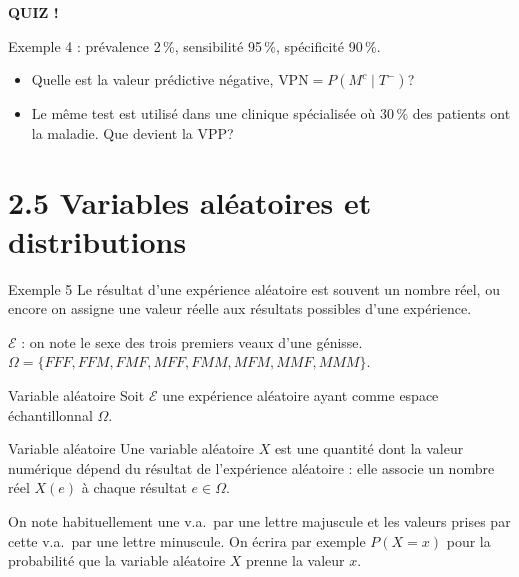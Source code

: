 \documentclass{BeamerTemplate}
\begin{document}
\begin{frame}[plain,t]
  \centerline{\LARGE\bfseries\alert{QUIZ !}}

  \medskip
  Exemple 4 : prévalence 2\,\%, sensibilité 95\,\%, spécificité 90\,\%.
  \begin{itemize}\itemsep 1.5cm
    \item Quelle est la \alert{valeur prédictive négative},
      $\text{VPN} = P(M^c \mid T^-)$?
    \item<2-> Le même test est utilisé dans une clinique spécialisée où
      30\,\% des patients ont la maladie. Que devient la VPP?
  \end{itemize}
\end{frame}

\section[Variables aléatoires]{2.5 Variables aléatoires et distributions}

\begin{frame}[t]{Exemple 5}
  Le résultat d'une expérience aléatoire est souvent un nombre réel, ou encore
  on assigne une valeur réelle aux résultats possibles d'une expérience.

  \medskip
  $\mathcal{E}$ : on note le sexe des trois premiers veaux d'une génisse.\\
  $\Omega = \{FFF, FFM, FMF, MFF, FMM, MFM, MMF, MMM\}$.

  \medskip
\end{frame}

\begin{frame}[t]{Variable aléatoire}
  Soit $\mathcal{E}$ une expérience aléatoire ayant comme espace
  échantillonnal $\Omega$.

  \begin{Boite}{Variable aléatoire}
    Une \alert{variable aléatoire} $X$ est une quantité dont la valeur
    numérique dépend du résultat de l'expérience aléatoire : elle associe un
    nombre réel $X(e)$ à chaque résultat $e \in \Omega$.
  \end{Boite}

  On note habituellement une v.a.\ par une lettre majuscule et les valeurs
  prises par cette v.a.\ par une lettre minuscule. On écrira par exemple
  $P(X = x)$ pour la probabilité que la variable aléatoire $X$ prenne la
  valeur $x$.
\end{frame}
\end{document}
